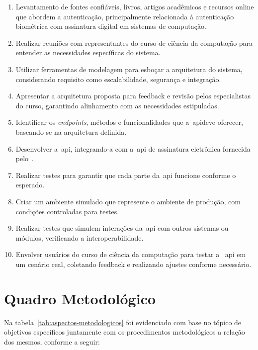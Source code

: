 \begin{enumerate}[label=\arabic*\textdegree\space Etapa:, leftmargin=2cm]
    \item Levantamento de fontes confiáveis, livros, artigos acadêmicos
    e recursos online que abordem a autenticação, principalmente relacionada à
    autenticação biométrica com assinatura digital em sistemas de computação.
    \item Realizar reuniões com representantes do curso de ciência da computação
    para entender as necessidades específicas do sistema.
    \item Utilizar ferramentas de modelagem para esboçar a arquitetura do
    sistema,
    considerando requisito como escalabilidade, segurança e integração.
    \item Apresentar a arquitetura proposta para feedback e revisão pelos
    especialistas do curso,
    garantindo alinhamento com as necessidades estipuladas.
    \item Identificar os \textit{endpoints}, métodos e funcionalidades que
    a~\acrshort{api}deve oferecer, baseando-se na arquitetura definida.
    \item Desenvolver a~\acrshort{api}, integrando-a com a~\acrshort{api} de
    assinatura eletrônica fornecida pelo~\citeauthor*{govbr2020}.
    \item Realizar testes para garantir que cada parte da~\acrshort{api}
    funcione conforme o esperado.
    \item Criar um ambiente simulado que represente o ambiente de produção,
    com condições controladas para testes.
    \item Realizar testes que simulem interações da~\acrshort{api} com outros
    sistemas
    ou módulos, verificando a interoperabilidade.
    \item Envolver usuários do curso de ciência da computação para testar a
    ~\acrshort{api} em um cenário real, coletando feedback e realizando
    ajustes conforme necessário.
\end{enumerate}
\section{Quadro Metodológico}\label{sec:quadro-metodologico}

Na tabela~\ref{tab:aspectos-metodologicos} foi evidenciado com base no
tópico de objetivos específicos juntamente com os procedimentos
metodológicos a relação dos mesmos, conforme a seguir:

